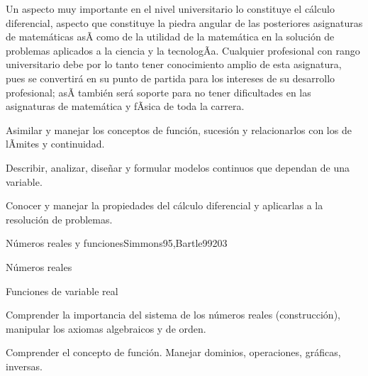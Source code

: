 \begin{syllabus}


\begin{justification}
Un aspecto muy importante en el nivel universitario lo constituye el cálculo diferencial,  aspecto que constituye la piedra angular de las posteriores asignaturas de matemáticas asÃ­ como de la utilidad de la matemática en la solución de problemas aplicados a la ciencia y la tecnologÃ­a. Cualquier profesional con rango universitario debe por lo tanto tener conocimiento amplio de esta asignatura, pues se convertirá en su punto de partida para los intereses de su desarrollo profesional; asÃ­ también será soporte para no tener dificultades en las asignaturas de matemática y fÃ­sica de toda la carrera.
\end{justification}

\begin{goals}
\item Asimilar y manejar los conceptos de función, sucesión y relacionarlos con los de lÃ­mites y continuidad.
\item Describir, analizar, diseñar y formular modelos continuos que dependan de una variable.
\item Conocer y manejar la propiedades del cálculo diferencial y aplicarlas a la resolución de problemas.
\end{goals}

\begin{outcomes}
\end{outcomes}

\begin{unit}{Números reales y funciones}{Simmons95,Bartle99}{20}{3}
   \begin{topics}
      \item Números reales
      \item Funciones de variable real
   \end{topics}

   \begin{unitgoals}
      \item Comprender la importancia del sistema de los números reales (construcción), manipular los axiomas algebraicos y de orden.
      \item Comprender el concepto de función. Manejar dominios, operaciones, gráficas, inversas.
      \end{unitgoals}
\end{unit}


\end{syllabus}
